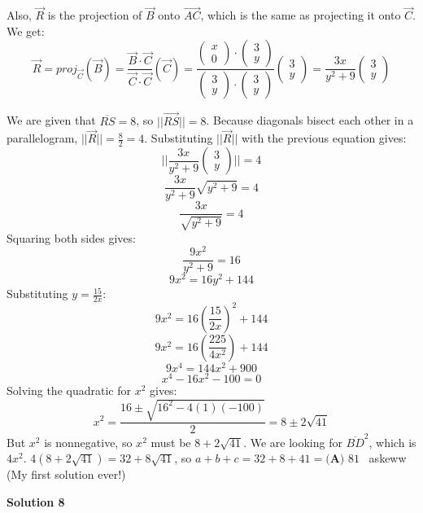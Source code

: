 \begin{enumerate}
 Also, $\vec{R}$ is the projection of $\vec{B}$ onto $\vec{AC}$, which is the same as projecting it onto $\vec{C}$. We get:
 \[\vec{R}=proj_{\vec{C}}{(\vec{B})}=\frac{\vec{B} \cdot \vec{C}}{\vec{C} \cdot \vec{C}}(\vec{C})=\frac{\begin{pmatrix}x \\ 0\end{pmatrix} \cdot \begin{pmatrix}3 \\ y\end{pmatrix}}{\begin{pmatrix}3 \\ y\end{pmatrix} \cdot \begin{pmatrix}3 \\ y\end{pmatrix}}\begin{pmatrix}3 \\ y\end{pmatrix}=\frac{3x}{y^2+9}\begin{pmatrix}3 \\ y\end{pmatrix}\]

 We are given that $\overline{RS} = 8$, so $||\vec{RS}|| = 8$. Because diagonals bisect each other in a parallelogram, $||\vec{R}|| = \frac{8}{2} = 4$. Substituting $||\vec{R}||$ with the previous equation gives:
 \[||\frac{3x}{y^2+9}\begin{pmatrix}3 \\ y\end{pmatrix}|| = 4\]
 \[\frac{3x}{y^2+9}\sqrt{y^2+9} = 4\]
 \[\frac{3x}{\sqrt{y^2+9}} = 4\]Squaring both sides gives:
 \[\frac{9x^2}{y^2+9}=16\]
 \[9x^2=16y^2+144\]Substituting $y=\frac{15}{2x}$:
 \[9x^2=16\left(\frac{15}{2x}\right)^2+144\]
 \[9x^2=16\left(\frac{225}{4x^2}\right)+144\]
 \[9x^4=144x^2+900\]
 \[x^4-16x^2-100=0\]Solving the quadratic for $x^2$ gives:
 \[x^2 = \frac{16 \pm \sqrt{16^2 - 4(1)(-100)}}{2} = 8 \pm 2\sqrt{41}\]But $x^2$ is nonnegative, so $x^2$ must be $8 + 2\sqrt{41}$. We are looking for $\overline{BD}^2$, which is $4x^2$. $4(8 + 2\sqrt{41}) = 32 + 8\sqrt{41}$, so $a + b + c = 32 + 8 + 41 = \boxed{\textbf{(A) } 81}$ ~askeww (My first solution ever!)

 



\textbf{Solution 8}


\end{enumerate}
